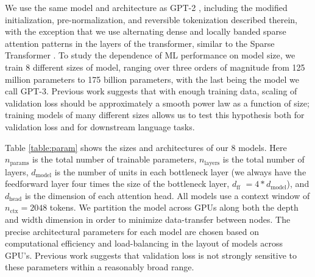 We use the same model and architecture as GPT-2 \cite{radford2019language}, including the modified initialization, pre-normalization, and reversible tokenization described therein, with the exception that we use alternating dense and locally banded sparse attention patterns in the layers of the transformer, similar to the Sparse Transformer \cite{child2019generating}. To study the dependence of ML performance on model size, we train 8 different sizes of model, ranging over three orders of magnitude from 125 million parameters to 175 billion parameters, with the last being the model we call GPT-3.  Previous work \cite{kaplan2020scaling} suggests that with enough training data, scaling of validation loss should be approximately a smooth power law as a function of size; training models of many different sizes allows us to test this hypothesis both for validation loss and for downstream language tasks.




Table \ref{table:param} shows the sizes and architectures of our 8 models.  Here $n_{\mathrm{params}}$ is the total number of trainable parameters, $n_{\mathrm{layers}}$ is the total number of layers, $d_{\mathrm{model}}$ is the number of units in each bottleneck layer (we always have the feedforward layer four times the size of the bottleneck layer, $d_{\mathrm{ff}}$ $= 4 \ast d_{\mathrm{model}}$), and $d_{\mathrm{head}}$ is the dimension of each attention head.  All models use a context window of $n_{\mathrm{ctx}}=2048$ tokens.  We partition the model across GPUs along both the depth and width dimension in order to minimize data-transfer between nodes. The precise architectural parameters for each model are chosen based on computational efficiency and load-balancing in the layout of models across GPU’s.  Previous work \cite{kaplan2020scaling} suggests that validation loss is not strongly sensitive to these parameters within a reasonably broad range.

